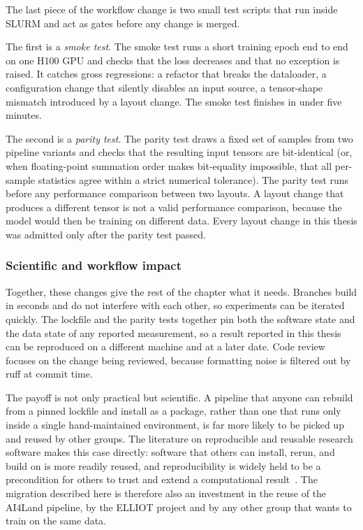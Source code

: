 \documentclass[12pt,a4paper]{article}
\begin{document}
The last piece of the workflow change is two small test scripts that run inside SLURM and act
as gates before any change is merged.

The first is a \emph{smoke test}. The smoke test runs a short training epoch end to end on one
H100 GPU and checks that the loss decreases and that no exception is raised. It catches gross
regressions: a refactor that breaks the dataloader, a configuration change that silently
disables an input source, a tensor-shape mismatch introduced by a layout change. The smoke
test finishes in under five minutes.

The second is a \emph{parity test}. The parity test draws a fixed set of samples from two
pipeline variants and checks that the resulting input tensors are bit-identical (or, when
floating-point summation order makes bit-equality impossible, that all per-sample statistics
agree within a strict numerical tolerance). The parity test runs before any performance
comparison between two layouts. A layout change that produces a different tensor is not a valid
performance comparison, because the model would then be training on different data. Every
layout change in this thesis was admitted only after the parity test passed.

\subsubsection{Scientific and workflow impact}

Together, these changes give the rest of the chapter what it needs. Branches build in seconds
and do not interfere with each other, so experiments can be iterated quickly. The lockfile and
the parity tests together pin both the software state and the data state of any reported
measurement, so a result reported in this thesis can be reproduced on a different machine and at
a later date. Code review focuses on the change being reviewed, because formatting noise is
filtered out by ruff at commit time.

The payoff is not only practical but scientific. A pipeline that anyone can rebuild from a
pinned lockfile and install as a package, rather than one that runs only inside a single
hand-maintained environment, is far more likely to be picked up and reused by other groups. The
literature on reproducible and reusable research software makes this case directly: software
that others can install, rerun, and build on is more readily reused, and reproducibility is
widely held to be a precondition for others to trust and extend a computational
result~\cite{sandve2013,barker2022}. The migration described here is therefore also an
investment in the reuse of the AI4Land pipeline, by the ELLIOT project and by any other group
that wants to train on the same data.
\end{document}
